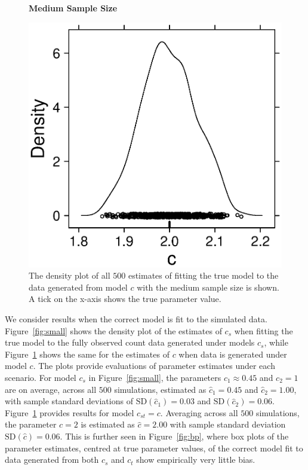 \documentclass[smallextended]{svjour3}
\begin{document}
\begin{figure}
  \textbf{Medium Sample Size}\par
  \centering
  \includegraphics[scale=0.75]{medium}
  \caption{The density plot of all $500$ estimates of fitting the true model to the data generated from model $c$ with the medium sample size is shown.  A tick on the x-axis shows the true parameter value.}
  \label{fig:medium}
\end{figure}

We consider results when the correct model is fit to the simulated data.  Figure~\ref{fig:small} shows the density plot of the estimates of $c_s$ when fitting the true model to the fully observed count data generated under models $c_s$, while Figure~\ref{fig:medium} shows the same for the estimates of $c$ when data is generated under model $c$.  The plots provide evaluations of parameter estimates under each scenario.  For model $c_s$ in Figure~\ref{fig:small}, the parameters $c_1 \approx 0.45$ and $c_2 = 1$ are on average, across all $500$ simulations, estimated as $\hat{c}_1 = 0.45$ and $\hat{c}_2 = 1.00$, with sample standard deviations of $\text{SD}(\hat{c}_1) = 0.03$ and $\text{SD}(\hat{c}_2) = 0.06$.  Figure~\ref{fig:medium} provides results for model $c_{st} = c$.  Averaging across all $500$ simulations, the parameter $c=2$ is estimated as $\hat{c} = 2.00$ with sample standard deviation $\text{SD}(\hat{c})=0.06$.  This is further seen in Figure~\ref{fig:bp}, where box plots of the parameter estimates, centred at true parameter values, of the correct model fit to data generated from both $c_s$ and $c_t$ show empirically very little bias.
\end{document}
